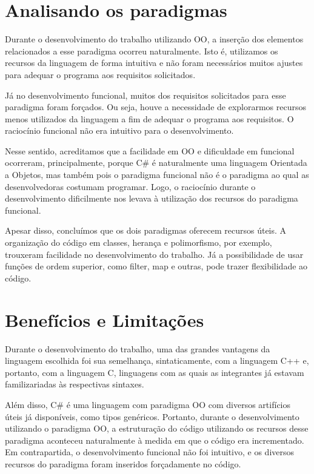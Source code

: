 \documentclass[rel_mlp]{iiufrgs}
\begin{document}
\section{Analisando os paradigmas}

Durante o desenvolvimento do trabalho utilizando OO, a inserção dos elementos relacionados a esse paradigma ocorreu naturalmente. Isto é, utilizamos os recursos da linguagem de forma intuitiva e não foram necessários muitos ajustes para adequar o programa aos requisitos solicitados. 

Já no desenvolvimento funcional, muitos dos requisitos solicitados para esse paradigma foram forçados. Ou seja, houve a necessidade de explorarmos recursos menos utilizados da linguagem a fim de adequar o programa aos requisitos. O raciocínio funcional não era intuitivo para o desenvolvimento.

Nesse sentido, acreditamos que a facilidade em OO e dificuldade em funcional ocorreram, principalmente, porque C\# é naturalmente uma linguagem Orientada a Objetos, mas também pois o paradigma funcional não é o paradigma ao qual as desenvolvedoras costumam programar. Logo, o raciocínio durante o desenvolvimento dificilmente nos levava à utilização dos recursos do paradigma funcional.

Apesar disso, concluímos que os dois paradigmas oferecem recursos úteis. A organização do código em classes, herança e polimorfismo, por exemplo, trouxeram facilidade no desenvolvimento do trabalho. Já a possibilidade de usar funções de ordem superior, como filter, map e outras, pode trazer flexibilidade ao código. 

\section{Benefícios e Limitações}

Durante o desenvolvimento do trabalho, uma das grandes vantagens da linguagem escolhida foi sua semelhança, sintaticamente, com a linguagem C++ e, portanto, com a linguagem C, linguagens com as quais as integrantes já estavam familizariadas às respectivas sintaxes.

Além disso, C\# é uma linguagem com paradigma OO com diversos artifícios úteis já disponíveis, como tipos genéricos. Portanto, durante o desenvolvimento utilizando o paradigma OO, a estruturação do código utilizando os recursos desse paradigma aconteceu naturalmente à medida em que o código era incrementado. Em contrapartida, o desenvolvimento funcional não foi intuitivo, e os diversos recursos do paradigma foram inseridos forçadamente no código.
\end{document}
